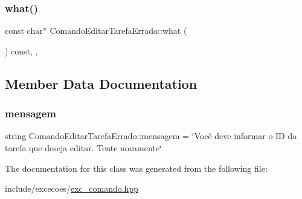 \subsubsection{\texorpdfstring{what()}{what()}}
{\footnotesize\ttfamily const char$\ast$ Comando\+Editar\+Tarefa\+Errado\+::what (\begin{DoxyParamCaption}{ }\end{DoxyParamCaption}) const\hspace{0.3cm}{\ttfamily [inline]}, {\ttfamily [override]}, {\ttfamily [noexcept]}}



\subsection{Member Data Documentation}
\mbox{\label{classComandoEditarTarefaErrado_a52e77fe112f01f71de548189720132c9}} 
\subsubsection{\texorpdfstring{mensagem}{mensagem}}
{\footnotesize\ttfamily string Comando\+Editar\+Tarefa\+Errado\+::mensagem = \char`\"{}Você deve informar o ID da tarefa que deseja editar. Tente novamente\char`\"{}\hspace{0.3cm}{\ttfamily [private]}}



The documentation for this class was generated from the following file\+:\begin{DoxyCompactItemize}
\item 
include/excecoes/\hyperlink{exc__comando_8hpp}{exc\+\_\+comando.\+hpp}\end{DoxyCompactItemize}
